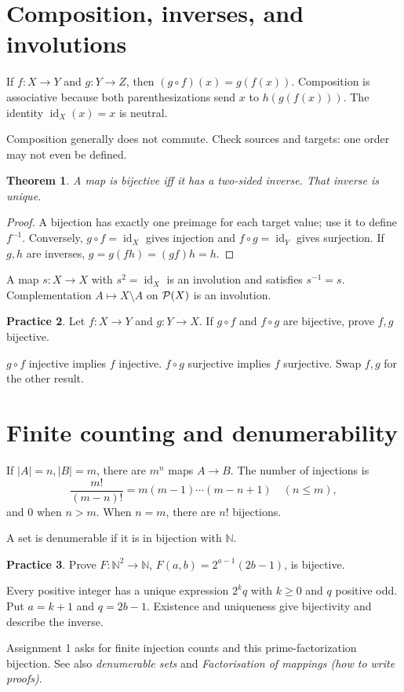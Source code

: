 \documentclass[11pt,openany]{book}
\newcommand{\N}{\mathbb N}\newcommand{\Z}{\mathbb Z}
\newcommand{\id}{\operatorname{id}}\newcommand{\Sym}{\operatorname{Sym}}
\newtheorem{theorem}{Theorem}[chapter]
\theoremstyle{definition}
\newtheorem{exercise}[theorem]{Practice}
\begin{document}
\section{Composition, inverses, and involutions}
If $f:X\to Y$ and $g:Y\to Z$, then $(g\circ f)(x)=g(f(x))$. Composition is associative because both parenthesizations send $x$ to $h(g(f(x)))$. The identity $\id_X(x)=x$ is neutral.
\begin{warningbox}Composition generally does not commute. Check sources and targets: one order may not even be defined.\end{warningbox}
\begin{theorem}A map is bijective iff it has a two-sided inverse. That inverse is unique.\end{theorem}
\begin{proof}A bijection has exactly one preimage for each target value; use it to define $f^{-1}$. Conversely, $g\circ f=\id_X$ gives injection and $f\circ g=\id_Y$ gives surjection. If $g,h$ are inverses, $g=g(fh)=(gf)h=h$.\end{proof}
A map $s:X\to X$ with $s^2=\id_X$ is an involution and satisfies $s^{-1}=s$. Complementation $A\mapsto X\setminus A$ on $\mathcal P(X)$ is an involution.
\begin{exercise}Let $f:X\to Y$ and $g:Y\to X$. If $g\circ f$ and $f\circ g$ are bijective, prove $f,g$ bijective.\end{exercise}
\begin{solution}$g\circ f$ injective implies $f$ injective. $f\circ g$ surjective implies $f$ surjective. Swap $f,g$ for the other result.\end{solution}

\section{Finite counting and denumerability}
If $|A|=n,|B|=m$, there are $m^n$ maps $A\to B$. The number of injections is
\[
\frac{m!}{(m-n)!}=m(m-1)\cdots(m-n+1)\quad(n\le m),
\]
and $0$ when $n>m$. When $n=m$, there are $n!$ bijections.

A set is denumerable if it is in bijection with $\N$.
\begin{exercise}Prove $F:\N^2\to\N$, $F(a,b)=2^{a-1}(2b-1)$, is bijective.\end{exercise}
\begin{solution}Every positive integer has a unique expression $2^kq$ with $k\ge0$ and $q$ positive odd. Put $a=k+1$ and $q=2b-1$. Existence and uniqueness give bijectivity and describe the inverse.\end{solution}
\begin{assignmentlink}Assignment 1 asks for finite injection counts and this prime-factorization bijection. See also \emph{denumerable sets} and \emph{Factorisation of mappings (how to write proofs)}.\end{assignmentlink}
\end{document}
